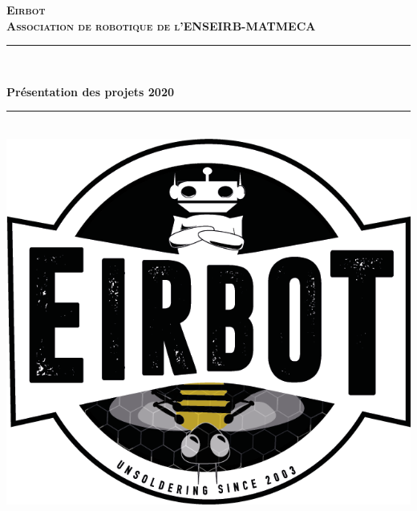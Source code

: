 \documentclass[a4paper,10pt]{article}
\newcommand{\HRule}{\rule{\linewidth}{0.1mm}}
\begin{document}
\begin{spacing}{1.5}
\graphicspath{{image/}}
  \begin{titlepage}
\begin{sffamily}
\begin{center}
\textbf{\textsc{\LARGE Eirbot \\ Association de robotique de
    l'ENSEIRB-MATMECA}}\\[0.5cm]
\HRule \\[0.2cm]
       {\Huge \bfseries Présentation des projets 2020 \\
       \HRule \\[0.5cm]

       \includegraphics[scale=0.5]{LogoEirbot.png}
       \vfill}
  \end{center}
  \end{sffamily}
\end{titlepage}
\setcounter{tocdepth}{2}
\newpage
\pagestyle{fancy}
\lhead{}
\rhead{\thepage}
\lfoot{}
\cfoot{}

\end{spacing}
\end{document}
